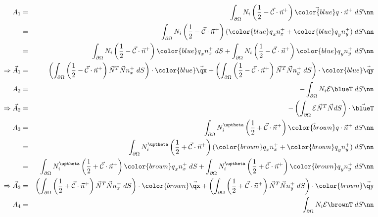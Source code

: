\begin{eqnarray}
A_1 
&=& \int_{\partial\Omega}{N_i} \left(\frac{1}{2} - \vec{\cal{C}} \cdot \vec{n}^+ \right) \vec{\color{blue}q}\cdot\vec{n}^+ \; dS \nn \\
&=& \int_{\partial\Omega}{N_i} \left(\frac{1}{2} - \vec{\cal{C}} \cdot \vec{n}^+ \right) ({\color{blue}q}_x n^+_x  +   {\color{blue}q}_y {n}_y^+) \; dS \nn \\
&=& \int_{\partial\Omega}{N_i} \left(\frac{1}{2} - \vec{\cal{C}} \cdot \vec{n}^+ \right) {\color{blue}q}_x n^+_x   \; dS 
+ \int_{\partial\Omega}{N_i} \left(\frac{1}{2} - \vec{\cal{C}} \cdot \vec{n}^+ \right)  {\color{blue}q}_y {n}_y^+ \; dS \nn \\
\Rightarrow {\vec A}_1
&=& \left( \int_{\partial\Omega}  \left(\frac{1}{2} - \vec{\cal{C}} \cdot \vec{n}^+ \right) \vec{N}^T \vec{N} n^+_x  \; dS  \right) \cdot {\color{blue}\vec{\qx}}  
+ \left( \int_{\partial\Omega}  \left(\frac{1}{2} - \vec{\cal{C}} \cdot \vec{n}^+ \right) \vec{N}^T \vec{N} n^+_y  \; dS  \right) \cdot {\color{blue}\vec{\qy}}  \\
A_2 &=& - \int_{\partial\Omega}{N_i}  {\cal{E}} \blueT  \; dS \nn\\
\Rightarrow {\vec A}_2 &=& - \left( \int_{\partial\Omega}   {\cal{E}}   \vec{N}^T \vec{N} dS \right) \cdot \vec{\blueT} \\
A_3 
&=& \int_{\partial\Omega}{N^\uptheta_i} \left(\frac{1}{2} + \vec{\cal{C}} \cdot \vec{n}^+ \right)
 \vec{\color{brown}q} \cdot\vec{n}^+   \; dS \nn\\
&=& \int_{\partial\Omega}{N^\uptheta_i} \left(\frac{1}{2} + \vec{\cal{C}} \cdot \vec{n}^+ \right)
 ({\color{brown}q}_x {n}_x^+  +  {\color{brown}q}_y {n}_y^+       )  \; dS \nn\\
&=& 
\int_{\partial\Omega}{N^\uptheta_i} \left(\frac{1}{2} + \vec{\cal{C}} \cdot \vec{n}^+ \right)  {\color{brown}q}_x {n}_x^+    \; dS 
+ \int_{\partial\Omega}{N^\uptheta_i} \left(\frac{1}{2} + \vec{\cal{C}} \cdot \vec{n}^+ \right)   {\color{brown}q}_y {n}_y^+    \; dS \nn\\
\Rightarrow {\vec A}_3 &=&
  \left(\int_{\partial\Omega} \left(\frac{1}{2} + \vec{\cal{C}} \cdot \vec{n}^+ \right) \vec{N}^T \vec{N} {n}_x^+    \; dS \right) \cdot  {\color{brown}\vec{\qx}}
+ \left(\int_{\partial\Omega} \left(\frac{1}{2} + \vec{\cal{C}} \cdot \vec{n}^+ \right) \vec{N}^T \vec{N} {n}_y^+    \; dS \right) \cdot  {\color{brown}\vec{\qy}} \\
A_4 &=& \int_{\partial\Omega}{N_i}   {\cal{E}}  \brownT   \; dS  \nn\\

\end{eqnarray}

